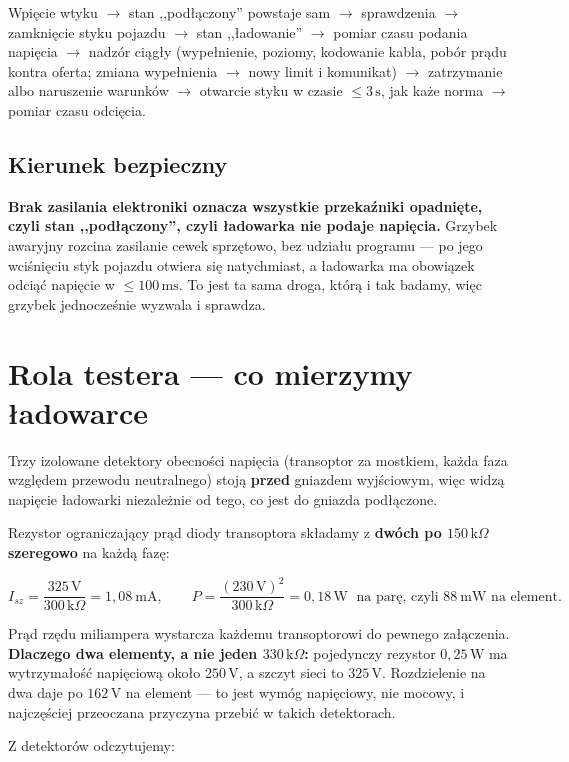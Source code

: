 \documentclass[a4paper,11pt]{article}
\newcommand{\kohm}{\,\mathrm{k}\Omega}
\newcommand{\volt}{\,\mathrm{V}}
\newcommand{\watt}{\,\mathrm{W}}
\newcommand{\ms}{\,\mathrm{ms}}
\newcommand{\sek}{\,\mathrm{s}}
\begin{document}
Wpięcie wtyku $\rightarrow$ stan ,,podłączony'' powstaje sam $\rightarrow$
sprawdzenia $\rightarrow$ zamknięcie styku pojazdu $\rightarrow$ stan ,,ładowanie''
$\rightarrow$ pomiar czasu podania napięcia $\rightarrow$ nadzór ciągły
(wypełnienie, poziomy, kodowanie kabla, pobór prądu kontra oferta; zmiana
wypełnienia $\rightarrow$ nowy limit i komunikat) $\rightarrow$ zatrzymanie albo
naruszenie warunków $\rightarrow$ otwarcie styku w czasie $\le 3\sek$, jak każe
norma $\rightarrow$ pomiar czasu odcięcia.

\subsection{Kierunek bezpieczny}

\textbf{Brak zasilania elektroniki oznacza wszystkie przekaźniki opadnięte, czyli
stan ,,podłączony'', czyli ładowarka nie podaje napięcia.} Grzybek awaryjny
rozcina zasilanie cewek sprzętowo, bez udziału programu --- po jego wciśnięciu
styk pojazdu otwiera się natychmiast, a ładowarka ma obowiązek odciąć napięcie
w $\le100\ms$. To jest ta sama droga, którą i tak badamy, więc grzybek jednocześnie
wyzwala i sprawdza.

\section{Rola testera --- co mierzymy ładowarce}
\label{sec:tester}

Trzy izolowane detektory obecności napięcia (transoptor za mostkiem, każda faza
względem przewodu neutralnego) stoją \textbf{przed} gniazdem wyjściowym, więc widzą
napięcie ładowarki niezależnie od tego, co jest do gniazda podłączone.

Rezystor ograniczający prąd diody transoptora składamy z \textbf{dwóch po
$150\kohm$ szeregowo} na każdą fazę:

\[
I_{sz}=\frac{325\volt}{300\kohm}=1{,}08\ \mathrm{mA},
\qquad
P=\frac{(230\volt)^2}{300\kohm}=0{,}18\watt \;\text{ na parę, czyli } 88\ \mathrm{mW}
\text{ na element.}
\]

Prąd rzędu miliampera wystarcza każdemu transoptorowi do pewnego załączenia.
\textbf{Dlaczego dwa elementy, a nie jeden $330\kohm$:} pojedynczy rezystor
$0{,}25\watt$ ma wytrzymałość napięciową około $250\volt$, a szczyt sieci to
$325\volt$. Rozdzielenie na dwa daje po $162\volt$ na element --- to jest wymóg
napięciowy, nie mocowy, i najczęściej przeoczana przyczyna przebić w takich
detektorach.

Z detektorów odczytujemy:
\end{document}
